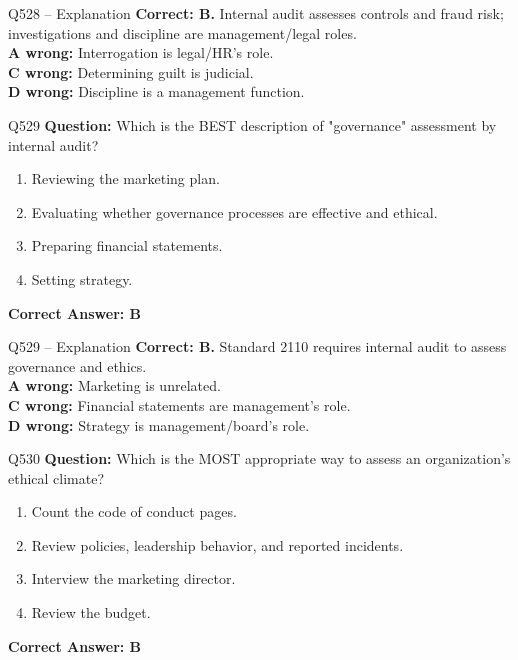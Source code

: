 \documentclass[aspectratio=169,10pt]{beamer}
\begin{document}
	\begin{frame}[t]{Q528 -- Explanation}
		\small
		\textbf{Correct: B.} Internal audit assesses controls and fraud risk; investigations and discipline are management/legal roles. \\[4pt]
		\textbf{A wrong:} Interrogation is legal/HR's role. \\[2pt]
		\textbf{C wrong:} Determining guilt is judicial. \\[2pt]
		\textbf{D wrong:} Discipline is a management function.
	\end{frame}
	
	\begin{frame}[t]{Q529}
		\small
		\textbf{Question:} Which is the BEST description of "governance" assessment by internal audit?
		\begin{enumerate}[label=\Alph*.,itemsep=1pt,topsep=2pt]
			\item Reviewing the marketing plan.
			\item Evaluating whether governance processes are effective and ethical.
			\item Preparing financial statements.
			\item Setting strategy.
		\end{enumerate}
		\vspace{4pt}
		\textbf{Correct Answer: B}
	\end{frame}
	
	\begin{frame}[t]{Q529 -- Explanation}
		\small
		\textbf{Correct: B.} Standard 2110 requires internal audit to assess governance and ethics. \\[4pt]
		\textbf{A wrong:} Marketing is unrelated. \\[2pt]
		\textbf{C wrong:} Financial statements are management's role. \\[2pt]
		\textbf{D wrong:} Strategy is management/board's role.
	\end{frame}
	
	\begin{frame}[t]{Q530}
		\small
		\textbf{Question:} Which is the MOST appropriate way to assess an organization's ethical climate?
		\begin{enumerate}[label=\Alph*.,itemsep=1pt,topsep=2pt]
			\item Count the code of conduct pages.
			\item Review policies, leadership behavior, and reported incidents.
			\item Interview the marketing director.
			\item Review the budget.
		\end{enumerate}
		\vspace{4pt}
		\textbf{Correct Answer: B}
	\end{frame}
	
\end{document}
